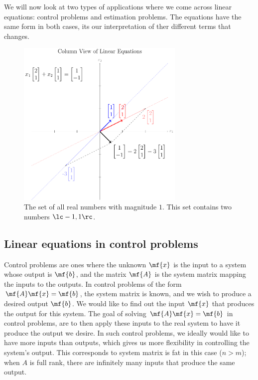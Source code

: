 We will now look at two types of applications where we come across linear equations: control problems and estimation problems. The equations have the same form in both cases, its our interpretation of ther different terms that changes.

\begin{figure}[h]
    \centering
    \includegraphics[width=0.714\textwidth]{figure/chapter03/lineqcolview.pdf}
    \caption{The set of all real numbers with magnitude $1$. This set contains two numbers $\lc -1, 1 \rc$.}
    \label{fig:ch03-lineq-col-view}
\end{figure}

\subsection{Linear equations in control problems}
Control problems are ones where the unknown $\mf{x}$ is the input to a system whose output is $\mf{b}$, and the matrix $\mf{A}$ is the system matrix mapping the inputs to the outputs. In control problems of the form $\mf{A}\mf{x} = \mf{b}$, the system matrix is known, and we wish to produce a desired output $\mf{b}$. We would like to find out the input $\mf{x}$ that produces the output for this system. The goal of solving $\mf{A}\mf{x} = \mf{b}$ in control problems, are to then apply these inputs to the real system to have it produce the output we desire. In such control problems, we ideally would like to have more inputs than outputs, which gives us more flexibility in controlling the system's output. This corresponds to system matrix is fat in this case ($n > m$); when $A$ is full rank, there are infinitely many inputs that produce the same output.

